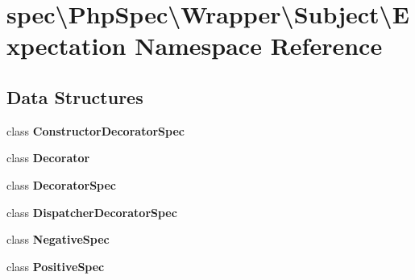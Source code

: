 \section{spec\textbackslash{}Php\+Spec\textbackslash{}Wrapper\textbackslash{}Subject\textbackslash{}Expectation Namespace Reference}
\label{namespacespec_1_1_php_spec_1_1_wrapper_1_1_subject_1_1_expectation}
\subsection*{Data Structures}
\begin{DoxyCompactItemize}
\item 
class {\bf Constructor\+Decorator\+Spec}
\item 
class {\bf Decorator}
\item 
class {\bf Decorator\+Spec}
\item 
class {\bf Dispatcher\+Decorator\+Spec}
\item 
class {\bf Negative\+Spec}
\item 
class {\bf Positive\+Spec}
\end{DoxyCompactItemize}
